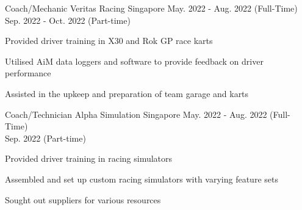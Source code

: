 

\begin{cventries}

  \cventry
    {Coach/Mechanic} %
    {Veritas Racing} %
    {Singapore} %
    {May. 2022 - Aug. 2022 (Full-Time)\\Sep. 2022 - Oct. 2022 (Part-time)} %
    {
      \begin{cvitems} %
        \item {Provided driver training in X30 and Rok GP race karts}
        \item {Utilised AiM data loggers and software to provide feedback on driver performance}
        \item {Assisted in the upkeep and preparation of team garage and karts}
      \end{cvitems}
    }

  \cventry
    {Coach/Technician} %
    {Alpha Simulation} %
    {Singapore} %
    {May. 2022 - Aug. 2022 (Full-Time)\\Sep. 2022 (Part-time)} %
    {
      \begin{cvitems} %
        \item {Provided driver training in racing simulators}
        \item {Assembled and set up custom racing simulators with varying feature sets}
        \item {Sought out suppliers for various resources}
      \end{cvitems}
    }



\end{cventries}
